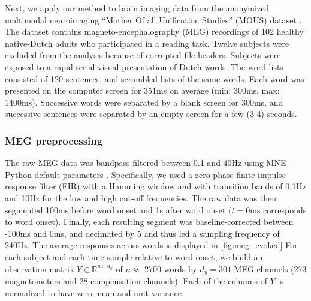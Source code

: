
Next, we apply our method to brain imaging data from the anonymized multimodal
neuroimaging ``Mother Of all Unification Studies'' (MOUS) dataset
\citep{schoffelen2019204}. The dataset contains magneto-encephalography (MEG)
recordings of 102 healthy native-Dutch adults who participated in a reading
task. Twelve subjects were excluded from the analysis because of corrupted file headers.
%
Subjects were exposed to a rapid serial visual presentation of Dutch words. The
word lists consisted of 120 sentences, and scrambled lists of the same words.
Each word was presented on the computer screen for 351ms on average (min: 300ms,
max: 1400ms). Successive words were separated by a blank screen for 300ms, and
successive sentences were separated by an empty screen for a few (3-4) seconds.

\subsubsection{MEG preprocessing}

The raw MEG data was bandpass-filtered between 0.1 and 40Hz using MNE-Python
default parameters \citep{gramfort2013meg, gramfort2014mne}. Specifically, we used a zero-phase finite impulse
response filter (FIR) with a Hamming window and with transition bands of 0.1Hz
and 10Hz for the low and high cut-off frequencies. The raw data was then segmented 100ms before word onset and 1s after
word onset ($t=0$ms corresponds to word onset). Finally, each resulting
segment was baseline-corrected between -100ms and 0ms, and decimated by 5 and
thus led a sampling frequency of 240Hz. The average responses across words is displayed in \ref{fig:meg_evoked}
For each subject and each time sample relative to word onset, we
build an observation matrix $Y \in \mathbb{R}^{n \times d_y}$ of $n\approx$ 2700 words
by $d_y=301$ MEG channels (273 magnetometers and 28 compensation channels). Each
of the columns of $Y$ is normalized to have zero mean and unit variance.



